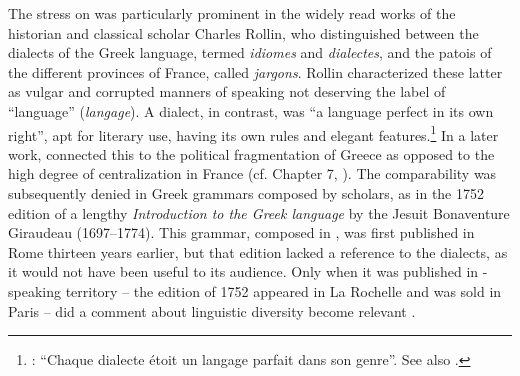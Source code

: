 The stress on  was particularly prominent in the widely read works of the  historian and classical scholar Charles Rollin, who distinguished between the dialects of the Greek language, termed \textit{idiomes} and \textit{dialectes}, and the patois of the different provinces of France, called \textit{jargons}. Rollin characterized these latter as vulgar and corrupted manners of speaking not deserving the label of “language” (\textit{langage}). A dialect, in contrast, was “a language perfect in its own right”, apt for literary use, having its own rules and elegant features.\footnote{\citet[117]{Rollin1726}: “Chaque dialecte étoit un langage parfait dans son genre”. See also \citet[395]{Rollin1731}.} In a later work, \citet[395]{Rollin1731} connected this to the political fragmentation of Greece as opposed to the high degree of centralization in France (cf. Chapter 7, ). The comparability was subsequently denied in Greek grammars composed by  scholars, as in the 1752 edition of a lengthy \textit{Introduction to the Greek language} by the  Jesuit Bonaventure Giraudeau (1697–1774). This grammar, composed in , was first published in Rome thirteen years earlier, but that edition lacked a reference to the  dialects, as it would not have been useful to its  audience. Only when it was published in -speaking territory – the edition of 1752 appeared in La Rochelle and was sold in Paris – did a comment about  linguistic diversity become relevant \citep[117]{Giraudeau1752}.


